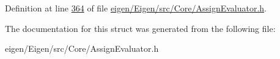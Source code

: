 Definition at line \hyperlink{eigen_2_eigen_2src_2_core_2_assign_evaluator_8h_source_l00364}{364} of file \hyperlink{eigen_2_eigen_2src_2_core_2_assign_evaluator_8h_source}{eigen/\+Eigen/src/\+Core/\+Assign\+Evaluator.\+h}.



The documentation for this struct was generated from the following file\+:\begin{DoxyCompactItemize}
\item 
eigen/\+Eigen/src/\+Core/\+Assign\+Evaluator.\+h\end{DoxyCompactItemize}
